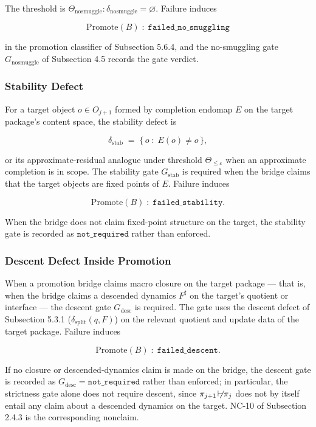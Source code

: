 \documentclass[11pt]{article}
\providecommand{\factor}{\mathrel{\!\vdash\!}}
\theoremstyle{definition}
\begin{document}
The threshold is \(\Theta_{\mathrm{nosmuggle}}:\delta_{\mathrm{nosmuggle}}=\varnothing\). Failure induces

\[
\mathrm{Promote}(B)\;:\;\texttt{failed\_no\_smuggling}
\]

in the promotion classifier of Subsection 5.6.4, and the no-smuggling gate \(G_{\mathrm{nosmuggle}}\) of Subsection 4.5 records the gate verdict.

\subsubsection{Stability Defect}

For a target object \(o\in O_{j+1}\) formed by completion endomap \(E\) on the target package's content space, the stability defect is

\[
\delta_{\mathrm{stab}}\;=\;\{\,o\;:\;E(o)\neq o\,\},
\]

or its approximate-residual analogue under threshold \(\Theta_{\le\varepsilon}\) when an approximate completion is in scope. The stability gate \(G_{\mathrm{stab}}\) is required when the bridge claims that the target objects are fixed points of \(E\). Failure induces

\[
\mathrm{Promote}(B)\;:\;\texttt{failed\_stability}.
\]

When the bridge does not claim fixed-point structure on the target, the stability gate is recorded as \(\texttt{not\_required}\) rather than enforced.

\subsubsection{Descent Defect Inside Promotion}

When a promotion bridge claims macro closure on the target package --- that is, when the bridge claims a descended dynamics \(F^\sharp\) on the target's quotient or interface --- the descent gate \(G_{\mathrm{desc}}\) is required. The gate uses the descent defect of Subsection 5.3.1 (\(\delta_{\mathrm{split}}(q,F)\)) on the relevant quotient and update data of the target package. Failure induces

\[
\mathrm{Promote}(B)\;:\;\texttt{failed\_descent}.
\]

If no closure or descended-dynamics claim is made on the bridge, the descent gate is recorded as \(G_{\mathrm{desc}}=\texttt{not\_required}\) rather than enforced; in particular, the strictness gate alone does not require descent, since \(\pi_{j+1}\not\factor\pi_j\) does not by itself entail any claim about a descended dynamics on the target. NC-10 of Subsection 2.4.3 is the corresponding nonclaim.
\end{document}
